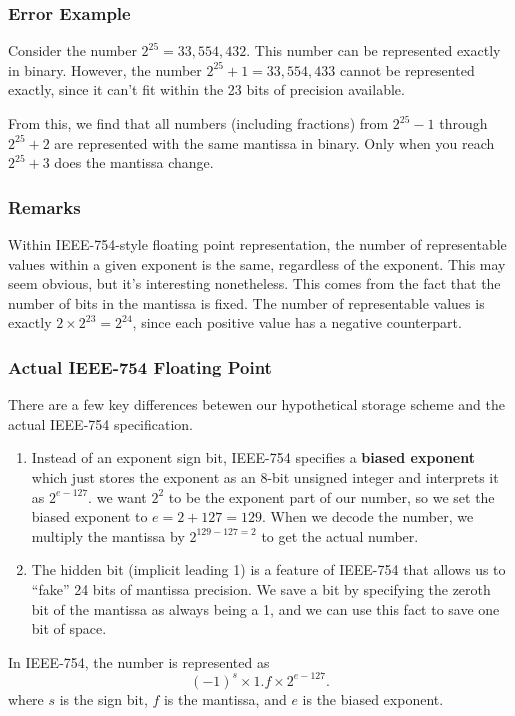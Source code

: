 \subsubsection{Error Example}

Consider the number $2^{25} = 33,554,432$. This number can be represented 
exactly in binary. However, the number $2^{25}+1 = 33,554,433$ cannot be
represented exactly, since it can't fit within the 23 bits of precision available.

From this, we find that all numbers (including fractions) from $2^{25}-1$ 
through $2^{25}+2$ are represented with the same mantissa in binary. Only when 
you reach $2^{25}+3$ does the mantissa change.

\subsubsection{Remarks}

Within IEEE-754-style floating point representation, the
number of representable values within a given exponent is the same, regardless
of the exponent. This may seem obvious, but it's interesting nonetheless. This
comes from the fact that the number of bits in the mantissa is fixed. The
number of representable values is exactly $2\times 2^{23} = 2^{24}$, since each
positive value has a negative counterpart.

\subsubsection{Actual IEEE-754 Floating Point}
There are a few key differences betewen our hypothetical storage scheme and the
actual IEEE-754 specification.

\begin{enumerate}
  \item Instead of an exponent sign bit, IEEE-754 specifies a \textbf{biased
    exponent} which just stores the exponent as an 8-bit unsigned integer and
    interprets it as $2^{e-127}$. \Ex we want $2^{2}$ to be the exponent part of
    our number, so we set the biased exponent to $e=2+127=129$. When we decode
    the number, we multiply the mantissa by $2^{129-127 = 2}$ to get the actual
    number.
  \item The hidden bit (implicit leading 1) is a feature of IEEE-754 that allows
    us to \enquote{fake} 24 bits of mantissa precision. We save a bit by
    specifying the zeroth bit of the mantissa as always being a 1, and we can
    use this fact to save one bit of space.
\end{enumerate}
In IEEE-754, the number is represented as
\[
  (-1)^{s} \times 1.f \times 2^{e-127}
.\]
where $s$ is the sign bit, $f$ is the mantissa, and $e$ is the biased exponent.

